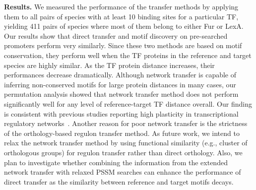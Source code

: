 \documentclass{llncs}
\begin{document}
\textbf{Results.}  We measured the performance of the transfer methods by
applying them to all pairs of species with at least 10 binding sites for a
particular TF, yielding 411 pairs of species where most of them belong to either
Fur or LexA. Our results show that direct transfer and motif discovery on
pre-searched promoters perform very similarly. Since these two methods are based
on motif conservation, they perform well when the TF proteins in the reference
and target species are highly similar. As the TF protein distance increases,
their performances decrease dramatically. Although network transfer is capable
of inferring non-conserved motifs for large protein distances in many cases, our
permutation analysis showed that network transfer method does not perform
significantly well for any level of reference-target TF distance overall. Our
finding is consistent with previous studies reporting high plasticity in
transcriptional regulatory networks~\cite{price2007orthologous}. Another reason
for poor network transfer is the strictness of the orthology-based regulon
transfer method. As future work, we intend to relax the network transfer method
by using functional similarity (e.g., cluster of orthologous groups) for regulon
transfer rather than direct orthology. Also, we plan to investigate whether
combining the information from the extended network transfer with relaxed PSSM
searches can enhance the performance of direct transfer as the similarity
between reference and target motifs decays.



\end{document}
